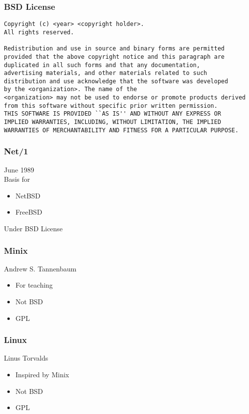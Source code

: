 \documentclass[8pt]{beamer}
\begin{document}
\begin{frame}[fragile]
  \frametitle{BSD License}
\begin{verbatim}
Copyright (c) <year> <copyright holder>.
All rights reserved.

Redistribution and use in source and binary forms are permitted
provided that the above copyright notice and this paragraph are
duplicated in all such forms and that any documentation,
advertising materials, and other materials related to such
distribution and use acknowledge that the software was developed
by the <organization>. The name of the
<organization> may not be used to endorse or promote products derived
from this software without specific prior written permission.
THIS SOFTWARE IS PROVIDED ``AS IS'' AND WITHOUT ANY EXPRESS OR
IMPLIED WARRANTIES, INCLUDING, WITHOUT LIMITATION, THE IMPLIED
WARRANTIES OF MERCHANTABILITY AND FITNESS FOR A PARTICULAR PURPOSE.
\end{verbatim}
\end{frame}

\begin{frame}
  \frametitle{Net/1}
  June 1989 \\
  \vspace{1em}
  Basis for
  \begin{itemize}
  \item NetBSD
  \item FreeBSD
  \end{itemize}
  \vspace{1em}
  Under BSD License
\end{frame}

\begin{frame}
  \frametitle{Minix}
  Andrew S. Tannenbaum
  \begin{itemize}
  \item For teaching
  \item Not BSD
  \item GPL
  \end{itemize}
\end{frame}

\begin{frame}
  \frametitle{Linux}
  Linus Torvalds
  \begin{itemize}
  \item Inspired by Minix
  \item Not BSD
  \item GPL
  \end{itemize}
\end{frame}
\end{document}
